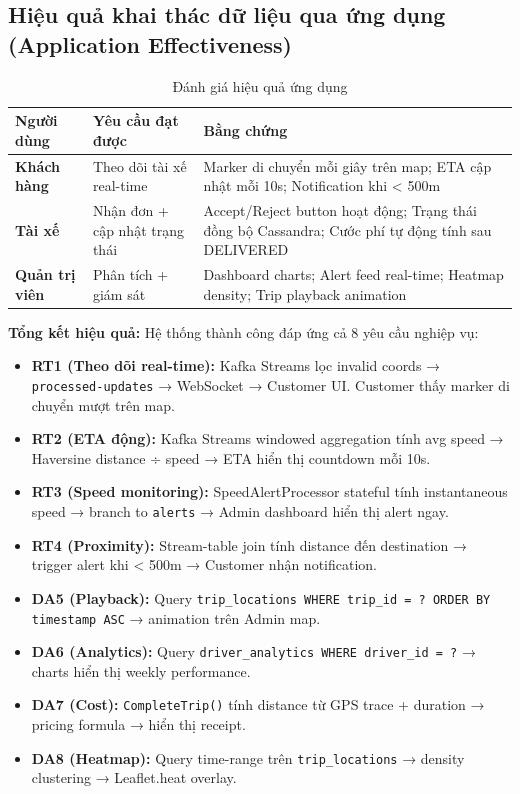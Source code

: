 \subsection{Hiệu quả khai thác dữ liệu qua ứng dụng (Application Effectiveness)}
\label{sec:effectiveness}

\bigskip
\begin{table}[H]
\centering
\caption[Đánh giá hiệu quả ứng dụng cho từng nhóm người dùng]{Đánh giá hiệu quả ứng dụng}
\label{tab:effectiveness}
\begin{tabular}{|p{3cm}|p{4cm}|p{5cm}|}
\hline
\textbf{Người dùng} & \textbf{Yêu cầu đạt được} & \textbf{Bằng chứng} \\
\hline
\textbf{Khách hàng} & Theo dõi tài xế real-time & Marker di chuyển mỗi giây trên map; ETA cập nhật mỗi 10s; Notification khi < 500m \\
\hline
\textbf{Tài xế} & Nhận đơn + cập nhật trạng thái & Accept/Reject button hoạt động; Trạng thái đồng bộ Cassandra; Cước phí tự động tính sau DELIVERED \\
\hline
\textbf{Quản trị viên} & Phân tích + giám sát & Dashboard charts; Alert feed real-time; Heatmap density; Trip playback animation \\
\hline
\end{tabular}
\end{table}

\bigskip
\noindent
\textbf{Tổng kết hiệu quả:} Hệ thống thành công đáp ứng cả 8 yêu cầu nghiệp vụ:

\bigskip
\begin{itemize}
    \item \textbf{RT1 (Theo dõi real-time):} Kafka Streams lọc invalid coords → \texttt{processed-updates} → WebSocket → Customer UI. Customer thấy marker di chuyển mượt trên map.
    \item \textbf{RT2 (ETA động):} Kafka Streams windowed aggregation tính avg speed → Haversine distance ÷ speed → ETA hiển thị countdown mỗi 10s.
    \item \textbf{RT3 (Speed monitoring):} SpeedAlertProcessor stateful tính instantaneous speed → branch to \texttt{alerts} → Admin dashboard hiển thị alert ngay.
    \item \textbf{RT4 (Proximity):} Stream-table join tính distance đến destination → trigger alert khi < 500m → Customer nhận notification.
    \item \textbf{DA5 (Playback):} Query \texttt{trip\_locations WHERE trip\_id = ? ORDER BY timestamp ASC} → animation trên Admin map.
    \item \textbf{DA6 (Analytics):} Query \texttt{driver\_analytics WHERE driver\_id = ?} → charts hiển thị weekly performance.
    \item \textbf{DA7 (Cost):} \texttt{CompleteTrip()} tính distance từ GPS trace + duration → pricing formula → hiển thị receipt.
    \item \textbf{DA8 (Heatmap):} Query time-range trên \texttt{trip\_locations} → density clustering → Leaflet.heat overlay.
\end{itemize}
